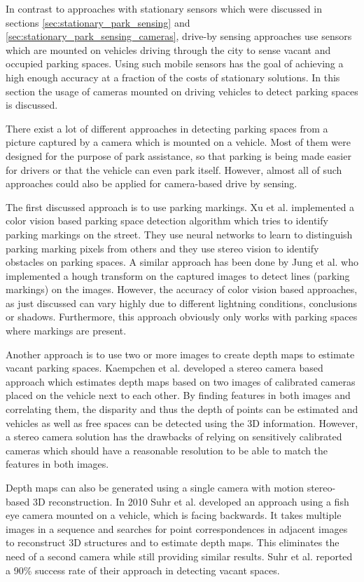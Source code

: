 In contrast to approaches with stationary sensors which were discussed in sections \ref{sec:stationary_park_sensing} and \ref{sec:stationary_park_sensing_cameras}, drive-by sensing approaches use sensors which are mounted on vehicles driving through the city to sense vacant and occupied parking spaces. Using such mobile sensors has the goal of achieving a high enough accuracy at a fraction of the costs of stationary solutions. In this section the usage of cameras mounted on driving vehicles to detect parking spaces is discussed.

There exist a lot of different approaches in detecting parking spaces from a picture captured by a camera which is mounted on a vehicle. Most of them  were designed for the purpose of park assistance, so that parking is being made easier for drivers or that the vehicle can even park itself. However, almost all of such approaches could also be applied for camera-based drive by sensing.

The first discussed approach is to use parking markings. Xu et al. \cite{Xu2000} implemented a color vision based parking space detection algorithm which tries to identify parking markings on the street. They use neural networks to learn to distinguish parking marking pixels from others and they use stereo vision to identify obstacles on parking spaces. A similar approach has been done by Jung et al. \cite{Jung2006} who implemented a hough transform on the captured images to detect lines (parking markings) on the images. However, the accuracy of color vision based approaches, as just discussed can vary highly due to different lightning conditions, conclusions or shadows. Furthermore, this approach obviously only works with parking spaces where markings are present.

Another approach is to use two or more images to create depth maps to estimate vacant parking spaces. Kaempchen et al. \cite{Kaempchen2002} developed a stereo camera based approach which estimates depth maps based on two images of calibrated cameras placed on the vehicle next to each other. By finding features in both images and correlating them, the disparity and thus the depth of points can be estimated and vehicles as well as free spaces can be detected using the 3D information. However, a stereo camera solution has the drawbacks of relying on sensitively calibrated cameras which should have a reasonable resolution to be able to match the features in both images.

Depth maps can also be generated using a single camera with motion stereo-based 3D reconstruction. In 2010 Suhr et al. \cite{Suhr2010} developed an approach using a fish eye camera mounted on a vehicle, which is facing backwards. It takes multiple images in a sequence and searches for point correspondences in adjacent images to reconstruct 3D structures and to estimate depth maps. This eliminates the need of a second camera while still providing similar results. Suhr et al. reported a 90\% success rate of their approach in detecting vacant spaces.

